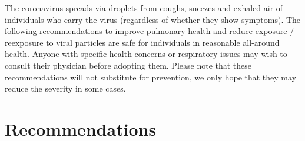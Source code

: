 \documentclass[onecolumn,journal]{IEEEtran}
\begin{document}
\begin{multicols}{2}
The coronavirus spreads via droplets from coughs, sneezes and exhaled air of individuals who carry the virus (regardless of whether they show symptoms). 
The following recommendations to improve pulmonary health and reduce exposure / reexposure to viral particles are safe for individuals in reasonable all-around health. 
Anyone with specific health concerns or respiratory issues may wish to consult their physician before adopting them. Please note that these recommendations will not substitute for prevention, we only hope that they may reduce the severity in some cases. 

\section*{Recommendations}


\end{multicols}
\end{document}
